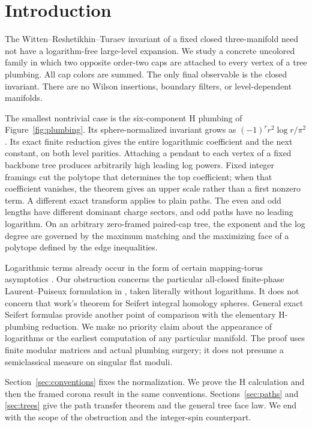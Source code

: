 \section{Introduction}

The Witten--Reshetikhin--Turaev invariant of a fixed closed three-manifold need not have a logarithm-free large-level expansion. We study a concrete uncolored family in which two opposite order-two caps are attached to every vertex of a tree plumbing. All cap colors are summed. The only final observable is the closed invariant. There are no Wilson insertions, boundary filters, or level-dependent manifolds.

The smallest nontrivial case is the six-component H plumbing of Figure~\ref{fig:plumbing}. Its sphere-normalized invariant grows as \((-1)^r r^2\log r/\pi^2\). Its exact finite reduction gives the entire logarithmic coefficient and the next constant, on both level parities. Attaching a pendant to each vertex of a fixed backbone tree produces arbitrarily high leading log powers. Fixed integer framings cut the polytope that determines the top coefficient; when that coefficient vanishes, the theorem gives an upper scale rather than a first nonzero term. A different exact transform applies to plain paths. The even and odd lengths have different dominant charge sectors, and odd paths have no leading logarithm. On an arbitrary zero-framed paired-cap tree, the exponent and the log degree are governed by the maximum matching and the maximizing face of a polytope defined by the edge inequalities.

Logarithmic terms already occur in the form of certain mapping-torus asymptotics \cite{AP}. Our obstruction concerns the particular all-closed finite-phase Laurent--Puiseux formulation in \cite[Conjecture~1.1]{AHLMS}, taken literally without logarithms. It does not concern that work's theorem for Seifert integral homology spheres. General exact Seifert formulas \cite{HT} provide another point of comparison with the elementary H-plumbing reduction. We make no priority claim about the appearance of logarithms or the earliest computation of any particular manifold. The proof uses finite modular matrices and actual plumbing surgery; it does not presume a semiclassical measure on singular flat moduli.

Section~\ref{sec:conventions} fixes the normalization. We prove the H calculation and then the framed corona result in the same conventions. Sections~\ref{sec:paths} and \ref{sec:trees} give the path transfer theorem and the general tree face law. We end with the scope of the obstruction and the integer-spin counterpart.
